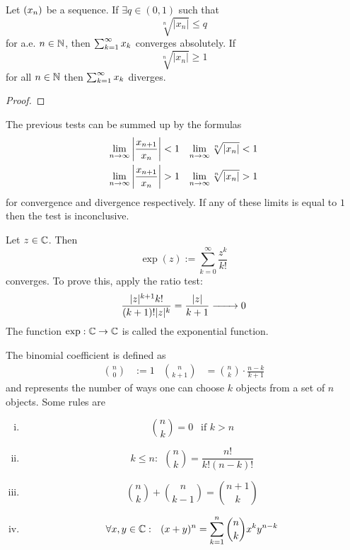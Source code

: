 \documentclass[../../script.tex]{subfiles}
\begin{document}
\begin{cor}
Let $\seq{x}$ be a sequence. If $\exists q \in (0, 1)$ such that
\[
	\sqrt[n]{|x_n|} \le q
\]
for a.e. $n \in \natn$, then $\series{k} x_k$ converges absolutely. If
\[
	\sqrt[n]{|x_n|} \ge 1
\]
for all $n \in \natn$ then $\series{k} x_k$ diverges.
\end{cor}
\begin{proof}
\reader
\end{proof}

\begin{rem}
The previous tests can be summed up by the formulas
\begin{align*}
	\limn \left|\frac{x_{n+1}}{x_n}\right| &< 1 & \limn \sqrt[n]{|x_n|} &< 1 \\
	\limn \left|\frac{x_{n+1}}{x_n}\right| &> 1 & \limn \sqrt[n]{|x_n|} &> 1
\end{align*}
for convergence and divergence respectively. If any of these limits is equal to $1$ then the test is inconclusive.
\end{rem}

\begin{eg}
Let $z \in \cmpln$. Then
\[
	\exp(z) := \sum_{k=0}^\infty \frac{z^k}{k!}
\]
converges. To prove this, apply the ratio test:
\[
	\frac{|z|^{k+1} k!}{(k+1)! |z|^k} = \frac{|z|}{k+1} \conv{} 0
\]
The function $\exp: \cmpln \rightarrow \cmpln$ is called the exponential function.
\end{eg}

\begin{rem}
The binomial coefficient is defined as
\begin{align*}
	{n\choose 0} &:= 1 & {n\choose k+1} &= {n\choose k} \cdot \frac{n-k}{k+1}
\end{align*}
and represents the number of ways one can choose $k$ objects from a set of $n$ objects. Some rules are
\begin{enumerate}[(i)]
	\item \[{n\choose k} = 0 ~~\text{ if } k > n\]
	\item \[k \le n: ~~{n\choose k} = \frac{n!}{k!(n-k)!}\]
	\item \[{n\choose k} + {n\choose k-1} = {n+1\choose k}\]
	\item \[\forall x, y \in \cmpln: ~~(x+y)^n = \series[n]{k} {n\choose k} x^ky^{n-k}\]
\end{enumerate}
\end{rem}
\end{document}
